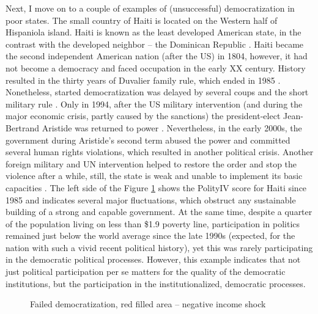 \documentclass[a4paper, 12pt]{article}
\begin{document}
	\noindent Next, I move on to a couple of examples of (unsuccessful) democratization in poor states. The small country of Haiti is located on the Western half of Hispaniola island. Haiti is known as the least developed American state, in the contrast with the developed neighbor -- the Dominican Republic \parencite{haiti1, haiti2}. Haiti became the second independent American nation (after the US) in 1804, however, it had not become a democracy and faced occupation in the early XX century. History resulted in the thirty years of Duvalier family rule, which ended in 1985 \parencite{haiti3, haiti4}. Nonetheless, started democratization was delayed by several coups and the short military rule \parencite{haiti5}. Only in 1994, after the US military intervention (and during the major economic crisis, partly caused by the sanctions) the president-elect Jean-Bertrand Aristide was returned to power \parencite{haiti6}. Nevertheless, in the early 2000s, the government during Aristide's second term abused the power and committed several human rights violations, which resulted in another political crisis. Another foreign military and UN intervention helped to restore the order and stop the violence after a while, still, the state is weak and unable to implement its basic capacities \parencite{haiti7}. The left side of the Figure \ref{fig:HTIGNB} shows the PolityIV score for Haiti since 1985 and indicates several major fluctuations, which obstruct any sustainable building of a strong and capable government. At the same time, despite a quarter of the population living on less than \$1.9 poverty line, participation in politics remained just below the world average since the late 1990s (expected, for the nation with such a vivid recent political history), yet this was rarely participating in the democratic political processes. However, this example indicates that not just political participation per se matters for the quality of the democratic institutions, but the participation in the institutionalized, democratic processes. 
	\\
	\begin{figure}[ht]
	    \centering
        \qquad
	    \caption{Failed democratization, red filled area -- negative income shock}
	    \label{fig:HTIGNB}
	\end{figure}
	
\end{document}
